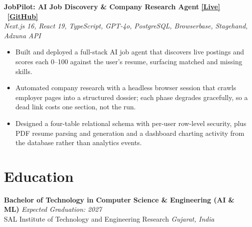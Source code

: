 \documentclass[11pt,a4paper,sans]{moderncv}
\begin{document}
\vspace{0.8mm}

\textbf{JobPilot: AI Job Discovery \& Company Research Agent} \hfill \href{https://jobpilot-sigma-rose.vercel.app/}{\textbf{[Live]}} \textbar\ \href{https://github.com/akashkuushwahaa/job-pilot}{\textbf{[GitHub]}} \\
{\small\textit{Next.js 16, React 19, TypeScript, GPT-4o, PostgreSQL, Browserbase, Stagehand, Adzuna API}}
\begin{itemize}
  \item Built and deployed a full-stack AI job agent that discovers live postings and scores each 0--100 against the user's resume, surfacing matched and missing skills.
  \item Automated company research with a headless browser session that crawls employer pages into a structured dossier; each phase degrades gracefully, so a dead link costs one section, not the run.
  \item Designed a four-table relational schema with per-user row-level security, plus PDF resume parsing and generation and a dashboard charting activity from the database rather than analytics events.
\end{itemize}

\section{Education}

\textbf{Bachelor of Technology in Computer Science \& Engineering (AI \& ML)} \hfill \textit{Expected Graduation: 2027} \\
SAL Institute of Technology and Engineering Research \hfill \textit{Gujarat, India}
\end{document}
